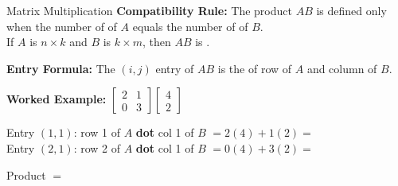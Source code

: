 \documentclass[10pt]{article}
\begin{document}
\begin{notesbox}{Matrix Multiplication}
  \textbf{Compatibility Rule:}
  The product $AB$ is defined only when the number of  of $A$
  equals the number of  of $B$.\\[4pt]
  If $A$ is $n \times k$ and $B$ is $k \times m$, then $AB$ is .

  \medskip
  \textbf{Entry Formula:}
  The $(i,j)$ entry of $AB$ is the  of row  of $A$
  and column  of $B$.

  \medskip
  \textbf{Worked Example:}
  $\begin{bmatrix}2 & 1 \\ 0 & 3\end{bmatrix}\begin{bmatrix}4 \\ 2\end{bmatrix}$

  \medskip
  Entry $(1,1)$: row 1 of $A$ \textbf{dot} col 1 of $B$ $= 2(4) + 1(2) = $ \\[6pt]
  Entry $(2,1)$: row 2 of $A$ \textbf{dot} col 1 of $B$ $= 0(4) + 3(2) = $ 

  \medskip
  Product $= $ 
\end{notesbox}

\vspace{0.06in}
\end{document}
